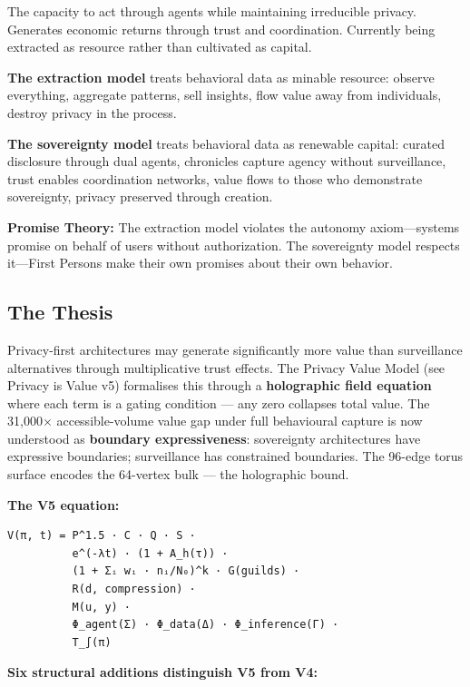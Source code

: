 \documentclass[
]{article}
\begin{document}
The capacity to act through agents while maintaining irreducible
privacy. Generates economic returns through trust and coordination.
Currently being extracted as resource rather than cultivated as capital.

\textbf{The extraction model} treats behavioral data as minable
resource: observe everything, aggregate patterns, sell insights, flow
value away from individuals, destroy privacy in the process.

\textbf{The sovereignty model} treats behavioral data as renewable
capital: curated disclosure through dual agents, chronicles capture
agency without surveillance, trust enables coordination networks, value
flows to those who demonstrate sovereignty, privacy preserved through
creation.

\textbf{Promise Theory:} The extraction model violates the autonomy
axiom---systems promise on behalf of users without authorization. The
sovereignty model respects it---First Persons make their own promises
about their own behavior.

\subsection{The Thesis}\label{the-thesis}

Privacy-first architectures may generate significantly more value than
surveillance alternatives through multiplicative trust effects. The
Privacy Value Model (see Privacy is Value v5) formalises this through a
\textbf{holographic field equation} where each term is a gating
condition --- any zero collapses total value. The 31,000×
accessible-volume value gap under full behavioural capture is now
understood as \textbf{boundary expressiveness}: sovereignty
architectures have expressive boundaries; surveillance has constrained
boundaries. The 96-edge torus surface encodes the 64-vertex bulk --- the
holographic bound.

\textbf{The V5 equation:}

\begin{verbatim}
V(π, t) = P^1.5 · C · Q · S ·
          e^(-λt) · (1 + A_h(τ)) ·
          (1 + Σᵢ wᵢ · nᵢ/N₀)^k · G(guilds) ·
          R(d, compression) ·
          M(u, y) ·
          Φ_agent(Σ) · Φ_data(Δ) · Φ_inference(Γ) ·
          T_∫(π)
\end{verbatim}

\textbf{Six structural additions distinguish V5 from V4:}
\end{document}
